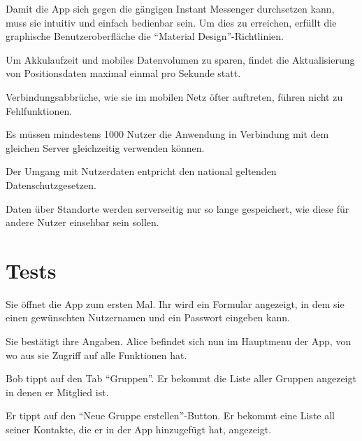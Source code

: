 \documentclass[parskip=full,11pt]{scrartcl}
\begin{document}
Damit die App sich gegen die gängigen Instant Messenger durchsetzen kann, muss
sie intuitiv und einfach bedienbar sein. Um dies zu erreichen, erfüllt die
graphische Benutzeroberfläche die \enquote{Material Design}-Richtlinien.

Um Akkulaufzeit und mobiles Datenvolumen zu sparen, findet die Aktualisierung
von Positionsdaten maximal einmal pro Sekunde statt.

Verbindungsabbrüche, wie sie im mobilen Netz öfter auftreten, führen nicht zu
Fehlfunktionen.

Es müssen mindestens 1000 Nutzer die Anwendung in Verbindung mit dem gleichen
Server gleichzeitig verwenden können.

%
Der Umgang mit Nutzerdaten entpricht den national geltenden
Datenschutzgesetzen.

Daten über Standorte werden serverseitig nur so lange gespeichert, wie diese
für andere Nutzer einsehbar sein sollen.

\pagebreak
\section{Tests}

{Sie öffnet die App zum ersten Mal.}
{Ihr wird ein Formular angezeigt, in dem sie einen gewünschten Nutzernamen
und ein Passwort eingeben kann.}

{Sie bestätigt ihre Angaben.}
{Alice befindet sich nun im Hauptmenu der App, von wo aus sie Zugriff auf alle Funktionen hat.}


{Bob tippt auf den Tab  \enquote{Gruppen}.}
{Er bekommt die Liste aller Gruppen angezeigt in denen er Mitglied ist.}

{Er tippt auf den \enquote{Neue Gruppe erstellen}-Button.}
{Er bekommt eine Liste all seiner Kontakte, die er in der App hinzugefügt hat, angezeigt.}
\end{document}
